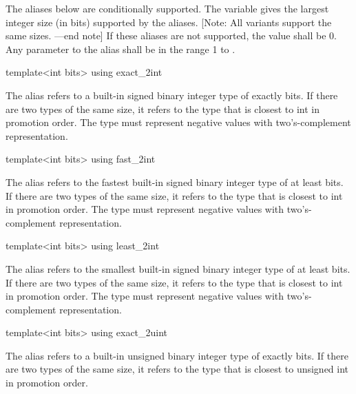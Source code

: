 \begin{addedblock}
The aliases below are conditionally supported. The  variable gives the largest integer size (in bits) supported by the aliases. [Note: All variants support the same sizes. —end note] If these aliases are not supported, the value shall be 0. Any parameter to the alias shall be in the range 1 to .

\begin{itemdecl}
template<int bits> using exact_2int
\end{itemdecl}

\begin{itemdescr}
The alias  refers to a built-in signed binary integer type of exactly  bits. If there are two types of the same size, it refers to the type that is closest to int in promotion order. The type must represent negative values with two's-complement representation.
\end{itemdescr}

\begin{itemdecl}
template<int bits> using fast_2int
\end{itemdecl}

\begin{itemdescr}
The alias  refers to the fastest built-in signed binary integer type of at least  bits. If there are two types of the same size, it refers to the type that is closest to int in promotion order. The type must represent negative values with two's-complement representation.
\end{itemdescr}

\begin{itemdecl}
template<int bits> using least_2int
\end{itemdecl}

\begin{itemdescr}
The alias  refers to the smallest built-in signed binary integer type of at least  bits. If there are two types of the same size, it refers to the type that is closest to int in promotion order. The type must represent negative values with two's-complement representation.
\end{itemdescr}

\begin{itemdecl}
template<int bits> using exact_2uint
\end{itemdecl}

\begin{itemdescr}
The alias  refers to a built-in unsigned binary integer type of exactly  bits. If there are two types of the same size, it refers to the type that is closest to unsigned int in promotion order.
\end{itemdescr}


\end{addedblock}
